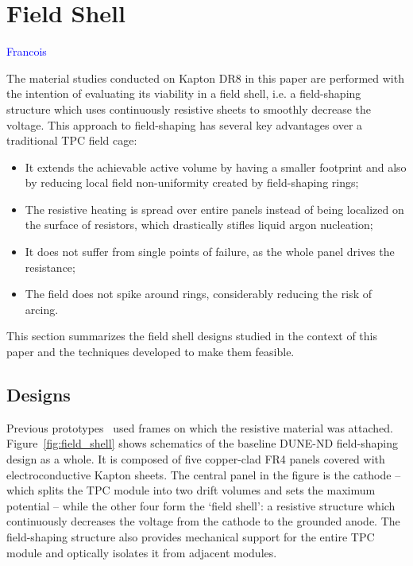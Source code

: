 \documentclass[a4paper,12pt]{article}
\begin{document}
\section{Field Shell}
\label{sec:field_shell}
\textcolor{blue}{Francois}

The material studies conducted on Kapton DR8 in this paper are performed with the intention of evaluating its viability in a field shell, i.e. a field-shaping structure which uses continuously resistive sheets to smoothly decrease the voltage. This approach to field-shaping has several key advantages over a traditional TPC field cage:
\begin{itemize}
  \item It extends the achievable active volume by having a smaller footprint and also by reducing local field non-uniformity created by field-shaping rings;
  \item The resistive heating is spread over entire panels instead of being localized on the surface of resistors, which drastically stifles liquid argon nucleation;
  \item It does not suffer from single points of failure, as the whole panel drives the resistance;
  \item The field does not spike around rings, considerably reducing the risk of arcing.
\end{itemize}
This section summarizes the field shell designs studied in the context of this paper and the techniques developed to make them feasible.

\subsection{Designs}
Previous prototypes~\cite{bern_lartpc,srmu_tpc} used frames on which the resistive material was attached. Figure~\ref{fig:field_shell} shows schematics of the baseline DUNE-ND field-shaping design as a whole. It is composed of five copper-clad FR4 panels covered with electroconductive Kapton sheets. The central panel in the figure is the cathode -- which splits the TPC module into two drift volumes and sets the maximum potential -- while the other four form the `field shell': a resistive structure which continuously decreases the voltage from the cathode to the grounded anode. The field-shaping structure also provides mechanical support for the entire TPC module and optically isolates it from adjacent modules.
\end{document}
